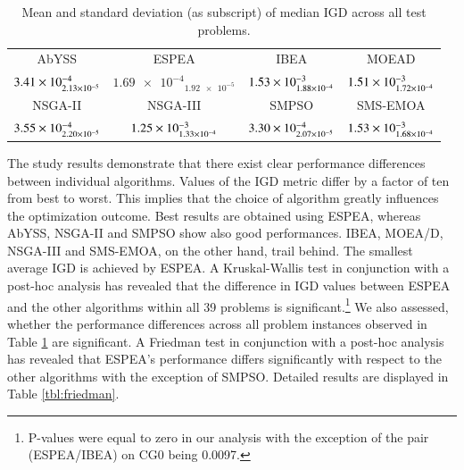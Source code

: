 \begin{table}
\caption{Mean and standard deviation (as subscript) of median IGD across all test problems.}
\label{tbl:summary}
\centering
\begin{tabular}{*{4}{c}} \toprule
AbYSS & ESPEA & IBEA & MOEAD\\ \cmidrule(lr){1-1} \cmidrule(lr){2-2} \cmidrule(lr){3-3} \cmidrule(lr){4-4}
$\num{3.41E-4}_{\num{2.13E-5}}$ & $\num{1.69e-4}_{\num{1.92e-5}}$ & $\num{1.53E-3}_{\num{1.88E-4}}$ & $\num{1.51E-3}_{\num{1.72E-4}}$ \\ \midrule
NSGA-II & NSGA-III & SMPSO & SMS-EMOA \\ \cmidrule(lr){1-1} \cmidrule(lr){2-2} \cmidrule(lr){3-3} \cmidrule(lr){4-4}
$\num{3.55E-4}_{\num{2.20E-5}}$ & $\num{1.25E-3}_{\num{1.33E-4}}$ & $\num{3.30E-4}_{\num{2.07E-5}}$ & $\num{1.53E-3}_{\num{1.68E-4}}$ \\
\bottomrule
\end{tabular}
\end{table}

The study results demonstrate that there exist clear performance differences between individual algorithms. Values of the IGD metric differ by a factor of ten from best to worst. This implies that the choice of algorithm greatly influences the optimization outcome. Best results are obtained using ESPEA, whereas AbYSS, NSGA-II and SMPSO show also good performances. IBEA, MOEA/D, NSGA-III and SMS-EMOA, on the other hand, trail behind. The smallest average IGD is achieved by ESPEA. A Kruskal-Wallis test \cite{kruskal1952use} in conjunction with a post-hoc analysis has revealed that the difference in IGD values between ESPEA and the other algorithms within all 39 problems is significant.\footnote{P-values were equal to zero in our analysis with the exception of the pair (ESPEA/IBEA) on CG0 being 0.0097.} We also assessed, whether the performance differences across all problem instances observed in Table \ref{tbl:summary} are significant. A Friedman test \cite{friedmantest} in conjunction with a post-hoc analysis has revealed that ESPEA's performance differs significantly with respect to the other algorithms with the exception of SMPSO. Detailed results are displayed in Table \ref{tbl:friedman}.

